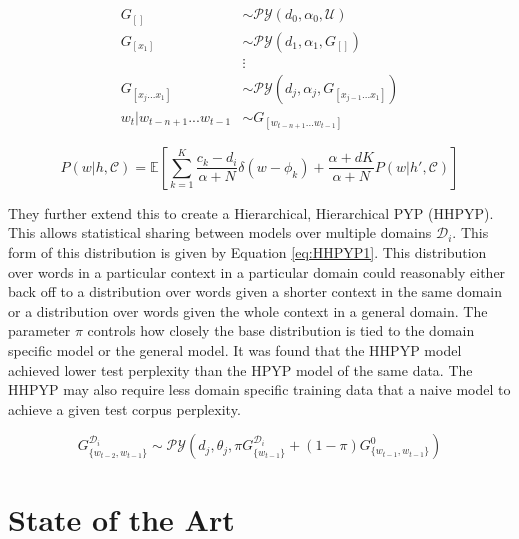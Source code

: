 \begin{subequations}
\begin{align}
G_{[]}&\sim\mathcal{PY}(d_{0},\alpha_{0},\mathcal{U})
\\
G_{[x_{1}]}&\sim\mathcal{PY}(d_{1},\alpha_{1},G_{[]})
\\
&\vdots\nonumber
\\
G_{[x_{j}...x_{1}]}&\sim\mathcal{PY}(d_{j},\alpha_{j},G_{[x_{j-1}...x_{1}]})
\\
w_{t}|w_{t-n+1}...w_{t-1}&\sim G_{[w_{t-n+1}...w_{t-1}]}
\end{align}
\label{eq:HNBASLMDA1}
\end{subequations}

\begin{equation}
P(w|h,\mathcal{C})=\mathbb{E}\left[\sum_{k=1}^{K}\frac{c_{k}-d_{i}}{\alpha+N}\delta(w-\phi_{k})+\frac{\alpha+dK}{\alpha+N}P(w|h',\mathcal{C})\right]
\label{eq:HBNASLMDA2.1posterior}
\end{equation}

They further extend this to create a Hierarchical, Hierarchical PYP (HHPYP). This allows statistical sharing between models over multiple domains $\mathcal{D}_{i}$. This form of this distribution is given by Equation \ref{eq:HHPYP1}. This distribution over words in a particular context in a particular domain could reasonably either back off to a distribution over words given a shorter context in the same domain or a distribution over words given the whole context in a general domain. The parameter $\pi$ controls how closely the base distribution is tied to the domain specific model or the general model. It was found that the HHPYP model achieved lower test perplexity than the HPYP model of the same data. The HHPYP may also require less domain specific training data that a naive model to achieve a given test corpus perplexity. 




\begin{equation}
G_{\{w_{t-2},w_{t-1}\}}^{\mathcal{D}_{i}}\sim\mathcal{PY}(d_{j},\theta_{j},\pi G_{\{w_{t-1}\}}^{\mathcal{D}_{i}}+(1-\pi)G_{\{w_{t-1},w_{t-1}\}}^{0})
\label{eq:HHPYP1}
\end{equation}


\section{State of the Art}



